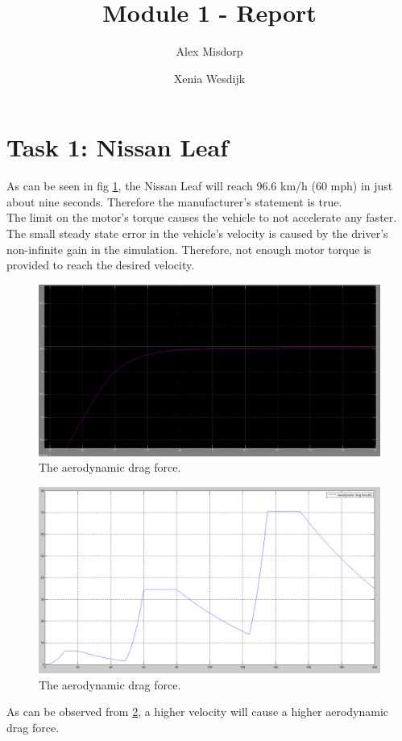 \documentclass[final]{scrreprt} %
\title{Module 1 - Report}
\author{Alex {Misdorp} \and Xenia {Wesdijk}}
\begin{document}
\section{Task 1: Nissan Leaf}

As can be seen in fig \ref{fig:acceleration}, the Nissan Leaf will reach 96.6 km/h (60 mph) in just about nine seconds. Therefore the manufacturer's statement is true.
\\The limit on the motor's torque causes the vehicle to not accelerate any faster.
\\The small steady state error in the vehicle's velocity is caused by the driver's non-infinite gain in the simulation. Therefore, not enough motor torque is provided to reach the desired velocity.
\begin{figure}[H]
\centering
\includegraphics[scale = 0.27]{resources/Accelerationzoom.png}
\caption{The aerodynamic drag force.}
\label{fig:acceleration}
\end{figure}
\begin{figure}[H]
\centering
\includegraphics[scale = 0.27]{resources/Aerodynamic.png}
\caption{The aerodynamic drag force.}
\label{fig:Aerodynamic}
\end{figure}
As can be observed from \ref{fig:Aerodynamic}, a higher velocity will cause a higher aerodynamic drag force.
\end{document}
